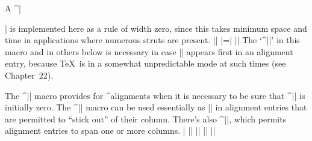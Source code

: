 {{\smallbreak
A ^|\strut| is implemented here as a rule of width zero, since this
takes minimum space and time in applications where numerous struts are
present.
\beginlines
|\newbox\strutbox|
|\setbox\strutbox=\hbox{\vrule height8.5pt depth3.5pt width0pt}|
|\def\strut{\relax\ifmmode\copy\strutbox\else\unhcopy\strutbox\fi}|
\weakendlines
The `^|\relax|' in this macro and in others below is necessary in case
|\strut| appears first in an alignment entry, because \TeX\ is in a
somewhat unpredictable mode at such times (see Chapter~22).

The ^|\ialign| macro provides for ^{alignments} when it is necessary to
be sure that ^|\tabskip| is initially zero. The ^|\hidewidth| macro can be
used essentially as |\hfill| in alignment entries that are permitted to
``stick out'' of their column. There's also ^|\multispan|, which permits
alignment entries to span one or more columns.
\beginlines
|\def\ialign{\everycr={}\tabskip=0pt \halign} %
|\def\hidewidth{\hskip\hideskip}|
\smallbreak
|\newcount\mscount|
|\def\multispan#1{\omit \mscount=#1 \loop\ifnum\mscount>1 \sp@n\repeat}|
|\def\sp@n{\span\omit \advance\mscount by -1 }|
\endlines

}}
